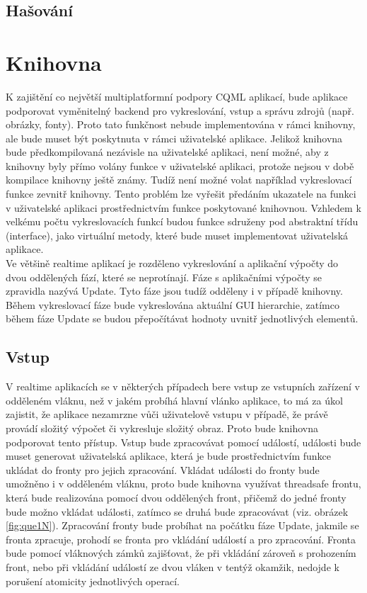 \documentclass[report,11pt]{elsarticle}
\begin{document}
\subsection {Hašování}


\section{\label{SEC:libI}Knihovna}
K zajištění co největší multiplatformní podpory CQML aplikací, bude aplikace podporovat vyměnitelný backend pro vykreslování, vstup a správu zdrojů (např. obrázky, fonty). Proto tato funkčnost nebude implementována v rámci knihovny, ale bude muset být poskytnuta v rámci uživatelské aplikace. 
Jelikož knihovna bude předkompilovaná nezávisle na uživatelské aplikaci, není možné, aby z knihovny byly přímo volány funkce v uživatelské aplikaci, protože nejsou v době kompilace knihovny ještě známy. Tudíž není možné volat například vykreslovací funkce zevnitř knihovny. Tento problém lze vyřešit předáním ukazatele na funkci v uživatelské aplikaci prostřednictvím funkce poskytované knihovnou. Vzhledem k velkému počtu vykreslovacích funkcí budou funkce sdruženy pod abstraktní třídu (interface), jako virtuální metody, které bude muset implementovat uživatelská aplikace.\\

Ve většině realtime aplikací je rozděleno vykreslování a aplikační výpočty do dvou oddělených fází, které se neprotínají. Fáze s aplikačními výpočty se zpravidla nazývá Update. Tyto fáze jsou tudíž odděleny i v případě knihovny. Během vykreslovací fáze bude vykreslována aktuální GUI hierarchie, zatímco během fáze Update se budou přepočítávat hodnoty uvnitř jednotlivých elementů.\\

\subsection {Vstup}
V realtime aplikacích se v některých případech bere vstup ze vstupních zařízení v odděleném vláknu, než v jakém probíhá hlavní vlánko aplikace, to má za úkol zajistit, že aplikace nezamrzne vůči uživatelově vstupu v případě, že právě provádí složitý výpočet či vykresluje složitý obraz. Proto bude knihovna podporovat tento přístup. Vstup bude zpracovávat pomocí událostí, události bude muset generovat uživatelská aplikace, která je bude prostřednictvím funkce ukládat do fronty pro jejich zpracování. Vkládat události do fronty bude umožněno i v odděleném vláknu, proto bude knihovna využívat threadsafe frontu, která bude realizována pomocí dvou oddělených front, přičemž do jedné fronty bude možno vkládat události, zatímco se druhá bude zpracovávat (viz. obrázek \ref{fig:que1N}). Zpracování fronty bude probíhat na počátku fáze Update, jakmile se fronta zpracuje, prohodí se fronta pro vkládání událostí a pro zpracování. Fronta bude pomocí vláknových zámků zajišťovat, že při vkládání zároveň s prohozením front, nebo při vkládání událostí ze dvou vláken v tentýž okamžik, nedojde k porušení atomicity jednotlivých operací.\\
\end{document}
